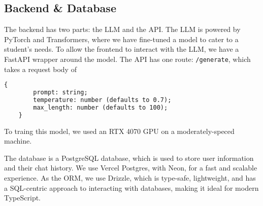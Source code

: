 \documentclass[9pt,a4paper,twocolumn,twoside]{tau-class/tau}
\begin{document}
\subsection{Backend \& Database}
The backend has two parts: the LLM and the API. The LLM is powered by PyTorch and Transformers, where we have fine-tuned a model to cater to a student's needs. To allow the frontend to interact with the LLM, we have a FastAPI wrapper around the model. The API has one route: \verb|/generate|, which takes a request body of \begin{lstlisting}[language=TeX, caption=Request Body for /generate]
	{
		prompt: string;
		temperature: number (defaults to 0.7);
		max_length: number (defaults to 100);
	}
\end{lstlisting} To traing this model, we used an RTX 4070 GPU on a moderately-speced machine.

The database is a PostgreSQL database, which is used to store user information and their chat history. We use Vercel Postgres, with Neon, for a fast and scalable experience. As the ORM, we use Drizzle, which is type-safe, lightweight, and has a SQL-centric approach to interacting with databases, making it ideal for modern TypeScript.
\end{document}
